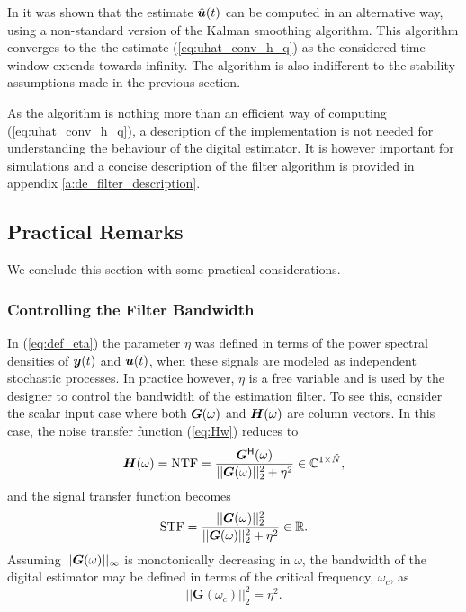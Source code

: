 In \cite{cbc_2011_loeliger} it was shown that the estimate $\hat{\bm{u}}(t)$ can be computed in an alternative way, using a non-standard version of the Kalman smoothing algorithm. This algorithm converges to the the estimate (\ref{eq:uhat_conv_h_q}) as the considered time window extends towards infinity. The algorithm is also indifferent to the stability assumptions made in the previous section.

As the algorithm is nothing more than an efficient way of computing (\ref{eq:uhat_conv_h_q}), a description of the implementation is not needed for understanding the behaviour of the digital estimator. It is however important for simulations and a concise description of the filter algorithm is provided in appendix \ref{a:de_filter_description}.









\subsection{Practical Remarks}
\label{sec:practical_remarks}
We conclude this section with some practical considerations.

\subsubsection*{Controlling the Filter Bandwidth}
In (\ref{eq:def_eta}) the parameter $\eta$ was defined in terms of the power spectral densities of $\bm{y}(t)$ and $\bm{u}(t)$, when these signals are modeled as independent stochastic processes. In practice however, $\eta$ is a free variable and is used by the designer to control the bandwidth of the estimation filter. To see this, consider the scalar input case where both $\bm{G}(\omega)$ and $\bm{H}(\omega)$ are column vectors. In this case, the noise transfer function (\ref{eq:Hw}) reduces to
\begin{equation}
    \label{eq:atf_scalar}
    \bm{H}(\omega) = \text{NTF} = \frac{\bm{G}^\mathsf{H}(\omega)}{||\bm{G}(\omega)||_2^2 + \eta^2} \in \mathbb{C}^{1 \times \tilde{N}},
\end{equation}
and the signal transfer function becomes
\begin{equation}
    \label{eq:stf_scalar}
    \text{STF} = \frac{||\bm{G}(\omega)||_2^2}{||\bm{G}(\omega)||_2^2 + \eta^2} \in \mathbb{R}.
\end{equation}
Assuming $||\bm{G}(\omega)||_{\infty}$ is monotonically decreasing in $\omega$, the bandwidth of the digital estimator may be defined in terms of the critical frequency, $\omega_{c}$, as
\begin{equation}
    \label{eq:def_BW}
    ||\bm{G}(\omega_c)||_2^2 = \eta^2.
\end{equation}


